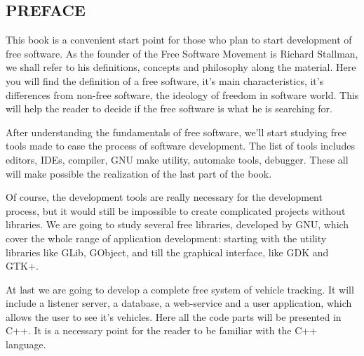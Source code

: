 
 






%


%

\newpage

\tableofcontents


\begin{center}
\chapter*{PREFACE}
\sectionmark*
\end{center}

This book is a convenient start point for those who plan to start development of free software. As the founder of the Free Software Movement is Richard Stallman, we shall refer to his definitions, concepts and philosophy along the material. Here you will find the definition of a free software, it's main characteristics, it's differences from non-free software, the ideology of freedom in software world. This will help the reader to decide if the free software is what he is searching for.

After understanding the fundamentals of free software, we'll start studying free tools made to ease the process of software development. The list of tools includes editors, IDEs, compiler, GNU make utility, automake tools, debugger. These all will make possible the realization of the last part of the book.

Of course, the development tools are really necessary for the development process, but it would still be impossible to create complicated projects without libraries. We are going to study several free libraries, developed by GNU, which cover the whole range of application development: starting with the utility libraries like GLib, GObject, and till the graphical interface, like GDK and GTK+.

At last we are going to develop a complete free system of vehicle tracking. It will include a listener server, a database, a web-service and a user application, which allows the user to see it's vehicles. Here all the code parts will be presented in C++. It is a necessary point for the reader to be familiar with the C++ language.

\let\cleardoublepage\clearpage






%
%
%
%


